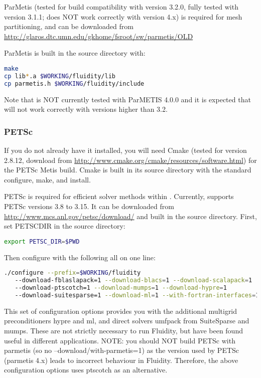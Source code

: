ParMetis (tested for \fluidity build compatibility with version 3.2.0, fully
tested with version 3.1.1; \fluidity does NOT work correctly with version 4.x) is required for mesh
partitioning, and can be downloaded from
\url{http://glaros.dtc.umn.edu/gkhome/fsroot/sw/parmetis/OLD}

ParMetis is built in the source directory with:

\begin{lstlisting}[language=bash]
make
cp lib*.a $WORKING/fluidity/lib
cp parmetis.h $WORKING/fluidity/include
\end{lstlisting}

Note that \fluidity is NOT currently tested with ParMETIS 4.0.0 and it is
expected that \fluidity will not work correctly with versions higher than 3.2.

\subsubsection{PETSc}
\label{sec:required_libraries_numerical_petsc}

If you do not already have it installed, you will need Cmake (tested for
version 2.8.12, download from
\url{http://www.cmake.org/cmake/resources/software.html}) for the PETSc Metis
build.  Cmake is built in its source directory with the standard configure,
make, and install.

PETSc is required for
efficient solver methods within \fluidity. Currently,
\fluidity supports PETSc versions 3.8 to 3.15. It can be downloaded from
\url{http://www.mcs.anl.gov/petsc/download/} and built in the source directory.
First, set PETSC{\textunderscore}DIR in the source directory:

\begin{lstlisting}[language=bash]
export PETSC_DIR=$PWD
\end{lstlisting}

Then configure with the following all on one line:

\begin{lstlisting}[language=bash]
./configure --prefix=$WORKING/fluidity
   --download-fblaslapack=1 --download-blacs=1 --download-scalapack=1
   --download-ptscotch=1 --download-mumps=1 --download-hypre=1
   --download-suitesparse=1 --download-ml=1 --with-fortran-interfaces=1
\end{lstlisting}

This set of configuration options provides you with the additional
multigrid preconditioners hypre and ml, and direct solvers umfpack
from SuiteSparse and mumps. These are not strictly necessary to run
Fluidity, but have been found useful in different applications. NOTE:
you should NOT build PETSc with parmetis
(so no --download/with-parmetis=1) as the version used by PETSc
(parmetis 4.x) leads to incorrect behaviour in Fluidity. Therefore, the above
configuration options uses ptscotch as an alternative.

